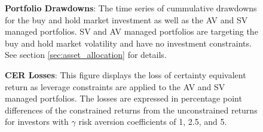 %	
\clearpage
\begin{figure}[!htb]
	\caption{{\bf Portfolio Drawdowns}: The time series of cummulative drawdowns for the buy and hold market investment as well as the AV and SV managed portfolios. SV and AV managed portfolios are targeting the buy and hold market volatility and have no investment constraints. See section \ref{sec:asset_allocation} for details.} \label{fig:fig_drawdowns}
	\vspace{-4mm}
	
\end{figure}
\begin{landscape}
	\begin{figure}[!htb]
		\caption{{\bf CER Losses}: This figure displays the loss of certainty equivalent return as leverage constraints are applied to the AV and SV managed portfolios. The losses are expressed in percentage point differences of the constrained returns from the unconstrained returns for investors with $\gamma$ risk aversion coefficients of 1, 2.5, and 5.} \label{fig:cer_loss}
		
	\end{figure}
\end{landscape}
\clearpage
\begin{figure}[!htb]
		\caption{{\bf CER Gains}: Certainity Equivalent Return gains for mean variance investors with risk aversion coefficients ranging from 1 to 5 and subject to investment constraints ranging from 1 to 3. See section \ref{sec:asset_allocation} for details.} \label{fig:cer_gain}
%		
	\begin{subfigure}{\textwidth}
		
	\end{subfigure}
	\begin{subfigure}{\textwidth}
		
	\end{subfigure}
\end{figure}
\clearpage
